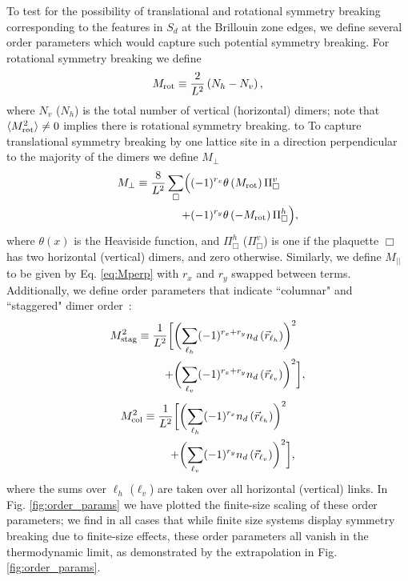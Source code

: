 \documentclass[twocolumn,prb,aps,floatfix,superscriptaddress]{revtex4-1}
\newcommand{\figref}[1]{Fig. \ref{#1}}
\newcommand{\exval}[1]{\langle #1 \rangle}
\newcommand{\Eqref}[1]{Eq. \eqref{#1}}
\newcommand{\Mrot}{M_{\rm{rot}}}
\newcommand{\Mperp}{M_\perp}
\newcommand{\Mpar}{M_{\vert\vert}}
\newcommand{\MstagSq}{M_{\rm{stag}}^2}
\newcommand{\McolSq}{M_{\rm{col}}^2}
\begin{document}
To test for the possibility of translational and rotational symmetry breaking corresponding to the features in $S_d$ at the Brillouin zone edges, we define several order parameters which would capture such potential symmetry breaking. For rotational symmetry breaking we define 
\begin{equation}
\Mrot \equiv  \frac{2}{L^2} \left(N_h - N_v\right) \label{eq:Mrot},
\end{equation}
where $N_v$ ($N_h$) is the total number of vertical (horizontal) dimers; note that $\exval{M_{\rm{rot}}^2 } \neq 0$ implies there is rotational symmetry breaking. to To capture translational symmetry breaking by one lattice site in a direction perpendicular to the majority of the dimers we define $\Mperp$ 
\begin{align}
\Mperp \equiv  \frac{8}{L^2} \sum_{\Box} \Bigl(  &(-1)^{r_x} \theta\left(\Mrot \right) \Pi_\Box^v \notag\\
+ &(-1)^{r_y}\theta\left(-\Mrot \right) \Pi_\Box^h\Bigr) \label{eq:Mperp},
\end{align}
where $\theta(x)$ is the Heaviside function, and $\Pi_\Box^h$ ($\Pi_\Box^v$) is one if the plaquette $\Box$ has two horizontal (vertical) dimers, and zero otherwise. Similarly, we define $\Mpar$ to be given by \Eqref{eq:Mperp} with $r_x$ and $r_y$ swapped between terms. Additionally, we define order parameters that indicate ``columnar" and ``staggered" dimer order~\cite{Syljuasen2005}:
\begin{align}
\MstagSq \equiv  \frac{1}{L^2} \biggl[ &\biggl( \sum_{\ell_h} (-1)^{r_x+r_y} n_d \left(\vec{r}_{\ell_h}\right) \biggr)^2  \notag\\
+&\biggl( \sum_{\ell_v} (-1)^{r_x+r_y} n_d \left(\vec{r}_{\ell_v}\right) \biggr)^2\biggr]\label{eq:Mstag},
\end{align}
\begin{align}
\McolSq \equiv  \frac{1}{L^2} \biggl[  &\biggl( \sum_{\ell_h} (-1)^{r_x} n_d \left(\vec{r}_{\ell_h}\right) \biggr)^2 \notag \\
+ &\biggl( \sum_{\ell_v} (-1)^{r_y} n_d \left(\vec{r}_{\ell_v}\right) \biggr)^2  \biggr]\label{eq:Mcol},
\end{align}
where the sums over $\ell_h$ ($\ell_v$) are taken over all horizontal (vertical) links. In \figref{fig:order_params} we have plotted the finite-size scaling of these order parameters; we find in all cases that while finite size systems display symmetry breaking due to finite-size effects, these order parameters all vanish in the thermodynamic limit, as demonstrated by the extrapolation in \figref{fig:order_params}.
\end{document}
